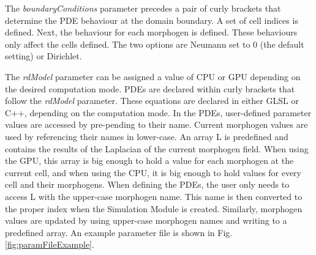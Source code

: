 The \textit{boundaryConditions} parameter precedes a pair of curly brackets that determine the PDE behaviour at the domain boundary. A set of cell indices is defined. Next, the behaviour for each morphogen is defined. These behaviours only affect the cells defined. The two options are Neumann set to 0 (the default setting) or Dirichlet. 

The \textit{rdModel} parameter can be assigned a value of CPU or GPU depending on the desired computation mode. PDEs are declared within curly brackets that follow the \textit{rdModel} parameter. These equations are declared in either GLSL or C++, depending on the computation mode. In the PDEs, user-defined parameter values are accessed by pre-pending  to their name. Current morphogen values are used by referencing their names in lower-case. An array L is predefined and contains the results of the Laplacian of the current morphogen field. When using the GPU, this array is big enough to hold a value for each morphogen at the current cell, and when using the CPU, it is big enough to hold values for every cell and their morphogens. When defining the PDEs, the user only needs to access L with the upper-case morphogen name. This name is then converted to the proper index when the Simulation Module is created. Similarly, morphogen values are updated by using upper-case morphogen names and writing to a predefined  array. An example parameter file is shown in Fig. \ref{fig:paramFileExample}.

